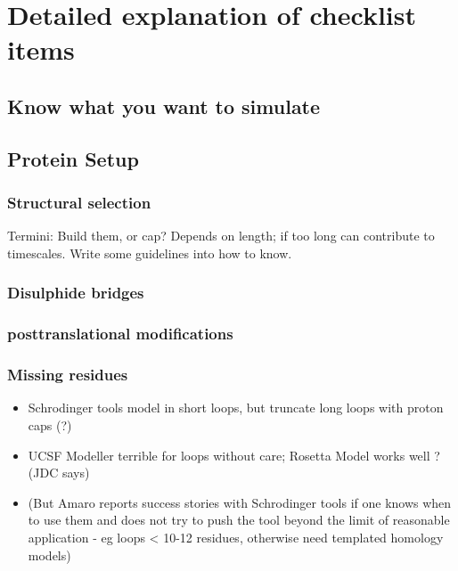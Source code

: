 \documentclass[9pt,bestpractices]{livecoms}
\begin{document}
\section{Detailed explanation of checklist items}
\subsection{Know what you want to simulate}
\label{sec:stage0}

\subsection{Protein Setup}
\label{sec:stage1}
\subsubsection{Structural selection}
Termini: Build them, or cap? Depends on length; if too long can contribute to timescales. Write some guidelines into how to know. %
\subsubsection{Disulphide bridges}
\subsubsection{posttranslational modifications}
\subsubsection{Missing residues}
    \begin{itemize}
    \item Schrodinger tools model in short loops, but truncate long loops with proton caps (?)
    \item UCSF Modeller terrible for loops without care; Rosetta Model works well ? (JDC says)
    \item (But Amaro reports success stories with Schrodinger tools if one knows when to use them and does not try to push the tool beyond the limit of reasonable application - eg loops < 10-12 residues, otherwise need templated homology models)
    \end{itemize}
    
\end{document}
